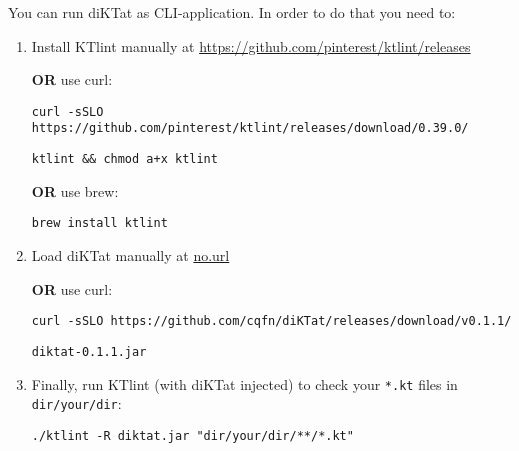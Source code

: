 You can run diKTat as CLI-application. In order to do that you need to:
\begin{enumerate}
    \item Install KTlint manually at \url{https://github.com/pinterest/ktlint/releases}
    \par
        \textbf{OR} use curl:
        \par
        \verb|curl -sSLO https://github.com/pinterest/ktlint/releases/download/0.39.0/|
        \par
        \verb|ktlint && chmod a+x ktlint|
    \par
        \textbf{OR} use brew:
        \par
        \verb|brew install ktlint|
    \item Load diKTat manually at \url{no.url}
    \par
        \textbf{OR} use curl:
        \par
        \verb|curl -sSLO https://github.com/cqfn/diKTat/releases/download/v0.1.1/|
        \par
        \verb|diktat-0.1.1.jar|
    \item Finally, run KTlint (with diKTat injected) to check your \verb|*.kt| files in \verb|dir/your/dir|:
    \par
        \verb|./ktlint -R diktat.jar "dir/your/dir/**/*.kt"|
\end{enumerate}
